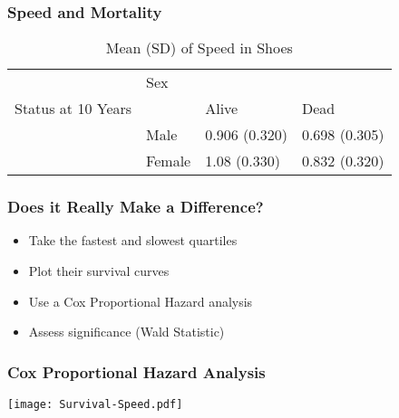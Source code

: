 \documentclass{beamer}
\begin{document}
\begin{frame}\frametitle{Speed and Mortality}
\begin{table}[ht]
\centering
\caption{Mean (SD) of Speed in Shoes} 
\begin{tabular}{llll}
  \hline
  \hline
 & Sex &  &  \\ 
  Status at 10 Years &  & Alive & Dead \\ 
   & Male & 0.906 (0.320) & 0.698 (0.305) \\ 
   & Female & 1.08 (0.330) & 0.832 (0.320) \\ 
   \hline
\end{tabular}
\end{table}\end{frame}
\begin{frame}\frametitle{Does it Really Make a Difference?}
\begin{itemize}
  \item Take the fastest and slowest quartiles
  \item Plot their survival curves
  \item Use a Cox Proportional Hazard analysis
  \item Assess significance (Wald Statistic)
\end{itemize}
\end{frame}

\begin{frame}\frametitle{Cox Proportional Hazard Analysis}
\texttt{[image: Survival-Speed.pdf]}
\end{frame}
\end{document}

